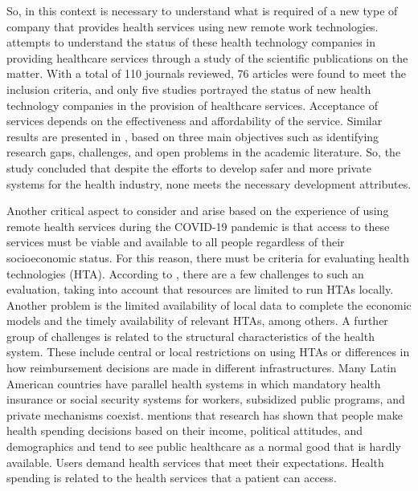 \documentclass[sustainability,article,submit,pdftex,moreauthors]{Definitions/mdpi}
\begin{document}
So, in this context is necessary to understand what is required of a new type of company that provides health services using new remote work technologies. \citet{chakraborty2021health} attempts to understand the status of these health technology companies in providing healthcare services through a study of the scientific publications on the matter. With a total of 110 journals reviewed, 76 articles were found to meet the inclusion criteria, and only five studies portrayed the status of new health technology companies in the provision of healthcare services. Acceptance of services depends on the effectiveness and affordability of the service. Similar results are presented in \citep{qahtan2022review}, based on three main objectives such as identifying research gaps, challenges, and open problems in the academic literature. So, the study concluded that despite the efforts to develop safer and more private systems for the health industry, none meets the necessary development attributes.

Another critical aspect to consider and arise based on the experience of using remote health services during the COVID-19 pandemic is that access to these services must be viable and available to all people regardless of their socioeconomic status. For this reason, there must be criteria for evaluating health technologies (HTA). According to \citep{drummond2022challenges}, there are a few challenges to such an evaluation, taking into account that resources are limited to run HTAs locally. Another problem is the limited availability of local data to complete the economic models and the timely availability of relevant HTAs, among others. A further group of challenges is related to the structural characteristics of the health system. These include central or local restrictions on using HTAs or differences in how reimbursement decisions are made in different infrastructures. Many Latin American countries have parallel health systems in which mandatory health insurance or social security systems for workers, subsidized public programs, and private mechanisms coexist. \citet{meleddu2020public} mentions that research has shown that people make health spending decisions based on their income, political attitudes, and demographics and tend to see public healthcare as a normal good that is hardly available. Users demand health services that meet their expectations. Health spending is related to the health services that a patient can access.
\end{document}
